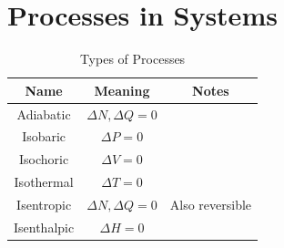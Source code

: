 \section{Processes in Systems}

\begin{table}[!htbp]
    \caption{Types of Processes}
    \centering
        \begin{tabular}{c|c c}
            \toprule
            Name        & Meaning                  & Notes \\
            \midrule
            Adiabatic   & $\Delta N,\Delta Q = 0$  & \\
            Isobaric    & $\Delta P = 0$           & \\
            Isochoric   & $\Delta V = 0$           & \\
            Isothermal  & $\Delta T = 0$           & \\
            Isentropic  & $\Delta N, \Delta Q = 0$ & Also reversible \\
            Isenthalpic & $\Delta H = 0$           &
    \end{tabular}
    \label{tab:processes}
\end{table}

